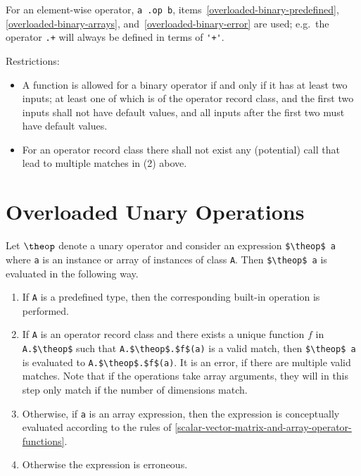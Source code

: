 For an element-wise operator, \lstinline!a .op b!, items~\ref{overloaded-binary-predefined}, \ref{overloaded-binary-arrays}, and~\ref{overloaded-binary-error} are used; e.g.\ the operator \lstinline!.+! will always be defined in terms of \lstinline!'+'!.

Restrictions:
\begin{itemize}
\item
  A function is allowed for a binary operator if and only if it has at
  least two inputs; at least one of which is of the operator record
  class, and the first two inputs shall not have default values, and all
  inputs after the first two must have default values.
\item
  For an operator record class there shall not exist any
  (potential) call that lead to multiple matches in (2) above.
\end{itemize}

\section{Overloaded Unary Operations}\label{overloaded-unary-operations}

Let $\theop$ denote a unary operator and consider an expression
\lstinline!$\theop$ a! where \lstinline!a! is an instance or array of instances of class
\lstinline!A!. Then \lstinline!$\theop$ a! is evaluated in the following way.

\begin{enumerate}
\item
  If \lstinline!A! is a predefined type, then the corresponding built-in
  operation is performed.
\item
  If \lstinline!A! is an operator record class and there exists a unique
  function $f$ in \lstinline!A.$\theop$! such that \lstinline!A.$\theop$.$f$(a)! is a valid
  match, then \lstinline!$\theop$ a! is evaluated to \lstinline!A.$\theop$.$f$(a)!. It is an
  error, if there are multiple valid matches.
  Note that if the operations take array arguments, they will in this step only match if the number of dimensions match.
\item
  \label{overloaded-unary-array}
  Otherwise, if \lstinline!a! is an array expression, then the expression
  is conceptually evaluated according to the rules of \cref{scalar-vector-matrix-and-array-operator-functions}.
\item
  Otherwise the expression is erroneous.
\end{enumerate}

